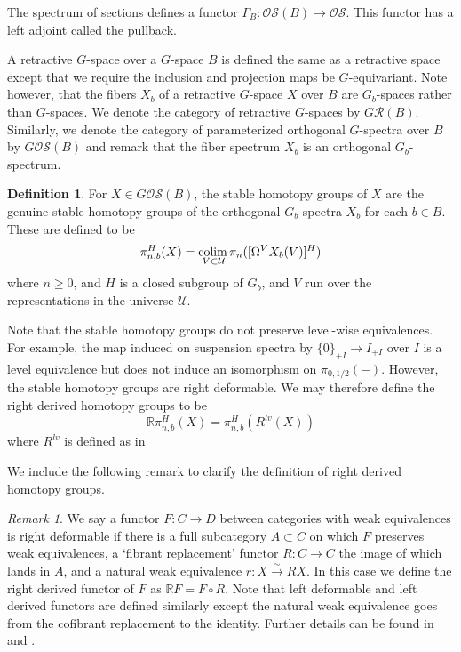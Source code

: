 \documentclass[11pt]{amsart}
\newcommand{\R}{\mathbb R}
\newcommand{\colim}{\textup{colim}\,}
\newcommand{\Osp}{\mathcal{OS}}
\theoremstyle{plain}   %
\theoremstyle{definition}
\newtheorem{df}[thm]{Definition}
\theoremstyle{remark}
\newtheorem{rmk}[thm]{Remark}
\numberwithin{equation}{section}
\begin{document}
The spectrum of sections defines a functor $\Gamma_B:\Osp(B)\to \Osp$. This functor has a left adjoint called the pullback. 

A retractive $G$-space over a $G$-space $B$ is defined the same as a retractive space except that we require the inclusion and projection maps be $G$-equivariant. Note however, that the fibers $X_b$ of a retractive $G$-space $X$ over $B$ are $G_b$-spaces rather than $G$-spaces. We denote the category of retractive $G$-spaces by $G\mathcal{R}(B)$. Similarly, we denote the category of parameterized orthogonal $G$-spectra over $B$ by $G\Osp(B)$ and remark that the fiber spectrum $X_b$ is an orthogonal $G_b$-spectrum.


\begin{df}
For $X\in G\Osp(B)$, the stable homotopy groups of $X$ are the genuine stable homotopy groups of the orthogonal $G_b$-spectra $X_b$ for each $b\in B$. These are defined to be
\[
\pi_{n,b}^H(X) = \underset{V\subset \mathcal{U}}{\colim}\pi_n([\Omega^VX_b(V)]^H)
\]
where $n\geq 0$, and $H$ is a closed subgroup of $G_b$, and $V$ run over the representations in the universe $\mathcal{U}$. 
\end{df}

Note that the stable homotopy groups do not preserve level-wise equivalences. For example, the map induced on suspension spectra by $\{0\}_{+I}\to I_{+I}$ over $I$ is a level equivalence but does not induce an isomorphism on $\pi_{0,1/2}(-)$. However, the stable homotopy groups are right deformable. We may therefore define the right derived homotopy groups to be 
\[
\mathbb{R}\pi_{n,b}^H(X) = \pi_{n,b}^H(R^{lv}(X))
\]
where $R^{lv}$ is defined as in \cite[4.2.5]{malkiewich_convenient}

We include the following remark to clarify the definition of right derived homotopy groups. 

\begin{rmk}
We say a functor $F:C\to D$ between categories with weak equivalences is right deformable if there is a full subcategory $A\subset C$ on which $F$ preserves weak equivalences, a `fibrant replacement' functor $R:C\to C$ the image of which lands in $A$, and a natural weak equivalence $r:X\xrightarrow{\sim} RX$. In this case we define the right derived functor of $F$ as $\R F=F\circ R$. Note that left deformable and left derived functors are defined similarly except the natural weak equivalence goes from the cofibrant replacement to the identity. Further details can be found in \cite{malkiewich_convenient} and \cite{dhks}.
\end{rmk}
\end{document}
